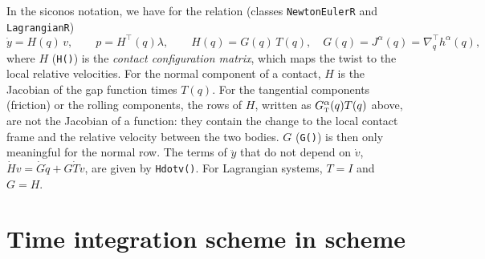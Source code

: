 In the siconos notation, we have for the relation (classes \texttt{NewtonEulerR} and
\texttt{LagrangianR})
\begin{equation}
  \label{eq:100}
  \dot y = H(q)\, v, \qquad p = H^\top(q)\lambda, \qquad
  H(q) = G(q)\, T(q), \quad G(q) = J^\alpha(q) = \nabla^\top_q h^\alpha(q),
\end{equation}
where $H$ (\texttt{H()}) is the \emph{contact configuration matrix}, which maps the twist to
the local relative velocities. For the normal component of a contact, $H$ is the Jacobian
of the gap function times $T(q)$. For the tangential components (friction) or the rolling
components, the rows of $H$, written as $G^\alpha_{\hbox{\tiny{T}}}(q) T(q)$ above, are not the Jacobian
of a function: they contain the change to the local contact frame and the relative velocity
between the two bodies. $G$ (\texttt{G()}) is then only meaningful for the normal row. The
terms of $\ddot y$ that do not depend on $\dot v$, $\dot H v = \dot G \dot q + G \dot T v$,
are given by \texttt{Hdotv()}. For Lagrangian systems, $T = I$ and $G = H$.







\section{Time integration scheme in scheme}



